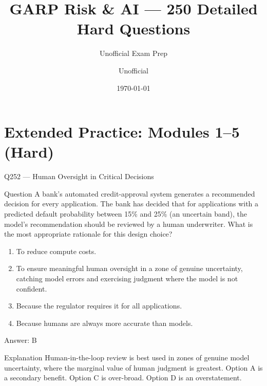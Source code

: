 \documentclass[aspectratio=169,8pt]{beamer}
\title[GARP RAI]{GARP Risk \& AI --- 250 Detailed Hard Questions}
\subtitle{Unofficial Exam Prep}
\author{Unofficial}
\date{\today}
\begin{document}
\section{Extended Practice: Modules 1--5 (Hard)}



\begin{frame}{Q252 --- Human Oversight in Critical Decisions}
\begin{block}{Question}
A bank's automated credit-approval system generates a recommended decision for every application. The bank has decided that for applications with a predicted default probability between 15\% and 25\% (an uncertain band), the model's recommendation should be reviewed by a human underwriter. What is the most appropriate rationale for this design choice?
\end{block}
\begin{enumerate}
\item To reduce compute costs.
\item To ensure meaningful human oversight in a zone of genuine uncertainty, catching model errors and exercising judgment where the model is not confident.
\item Because the regulator requires it for all applications.
\item Because humans are always more accurate than models.
\end{enumerate}
\begin{exampleblock}{Answer: B}\end{exampleblock}
\begin{block}{Explanation}
Human-in-the-loop review is best used in zones of genuine model uncertainty, where the marginal value of human judgment is greatest. Option A is a secondary benefit. Option C is over-broad. Option D is an overstatement.
\end{block}
\end{frame}
\end{document}
